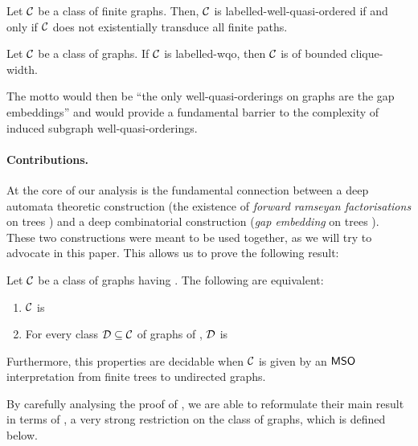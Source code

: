 \begin{conjecture}
    \label{transduction:conj}
    Let $\Cls$ be a class of finite graphs.
    Then, $\Cls$ is labelled-well-quasi-ordered
    if and only if
    $\Cls$
    does not existentially transduce all finite paths.
\end{conjecture}


\begin{conjecture}
    \label{nip-cw:conj}
    Let $\Cls$ be a class of graphs.
    If $\Cls$ is labelled-wqo,
    then $\Cls$ is of bounded clique-width.
\end{conjecture}

The motto would then be ``the only well-quasi-orderings on graphs are the gap
embeddings'' and would provide a fundamental barrier to the complexity of
induced subgraph well-quasi-orderings.

\clearpage

\paragraph*{Contributions.}

At the core of our analysis is the fundamental connection between a deep
automata theoretic construction (the existence of \emph{forward ramseyan
factorisations} on trees \cite{COLC07}) and a deep combinatorial construction
(\emph{gap embedding} on trees \cite{DERSHOWITZ200380}). These two
constructions were meant to be used together, as we will try to advocate in
this paper. This allows us to prove the following result:

\begin{theorem}
  Let $\Cls$ be a class of graphs having .
  The following are equivalent:
  \begin{enumerate}
    \item $\Cls$ is 
    \item For every class $\Cls[D] \subseteq \Cls$ of graphs of ,
      $\Cls[D]$ is 
  \end{enumerate}
  Furthermore, this properties are decidable when $\Cls$ is given 
  by an $\mathsf{MSO}$ interpretation from finite trees to undirected graphs.
\end{theorem}

By carefully analysing the proof of \cite{LOPEZ24}, we are able to reformulate
their main result in terms of ,
a very strong restriction on the class of graphs, which is defined below.

